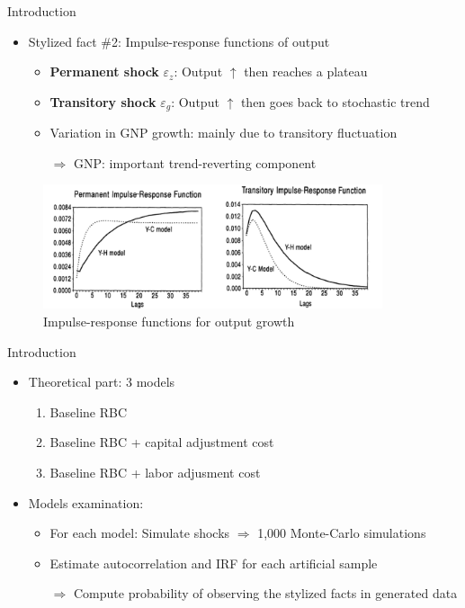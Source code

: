 \documentclass[10pt]{beamer}
\begin{document}
\begin{frame}{Introduction}
	\begin{itemize}
		\setlength\itemsep{1em}
		\item Stylized fact \#2: \alert{Impulse-response functions} of output
		      \begin{itemize}
		      	\item \textbf{Permanent shock} $\varepsilon_z$: Output $\uparrow$ then reaches a plateau
		      	\item \textbf{Transitory shock} $\varepsilon_g$: Output $\uparrow$ then goes back to stochastic trend
		      	\item Variation in GNP growth: mainly due to transitory fluctuation
		      	\item[$\Rightarrow$] GNP: important \alert{trend-reverting component}
		      \end{itemize}
	\end{itemize}
	\begin{figure}
		\centering
		\includegraphics[width=10cm]{figures/sf2.png}
		\caption{Impulse-response functions for output growth}
	\end{figure}
\end{frame}

\begin{frame}{Introduction}
	\begin{itemize}
		\setlength\itemsep{1em}
		\item \alert{Theoretical} part: 3 models
		      \begin{enumerate}
		      	\item Baseline RBC
		      	\item Baseline RBC + capital adjustment cost
		      	\item Baseline RBC + labor adjusment cost
		      \end{enumerate}
		\item Models examination:
		      \begin{itemize}
		      	\item For each model: Simulate shocks $\Rightarrow$ 1,000 \alert{Monte-Carlo
		      	simulations}
		      	\item Estimate autocorrelation and IRF for each artificial sample
		      	\item[$\Rightarrow$] Compute \alert{probability of observing the stylized facts} in generated data
		      \end{itemize}
	\end{itemize}
\end{frame}
\end{document}
